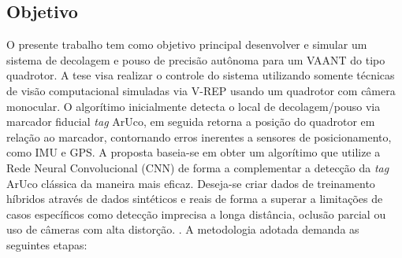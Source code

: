 

\subsection{Objetivo}

O presente trabalho tem como objetivo principal desenvolver e simular um sistema de decolagem e pouso de precisão autônoma para um VAANT do tipo quadrotor. A tese visa realizar o controle do sistema utilizando somente técnicas de visão computacional simuladas via V-REP usando um quadrotor com câmera monocular. O algorítimo inicialmente detecta o local de decolagem/pouso via marcador fiducial \textit{tag} ArUco, em seguida retorna a posição do quadrotor em relação ao marcador, contornando erros inerentes a sensores de posicionamento, como IMU e GPS. A proposta baseia-se em obter um algorítimo que utilize a Rede Neural Convolucional (CNN) de forma a complementar a detecção da \textit{tag} ArUco clássica da maneira mais eficaz. Deseja-se criar dados de treinamento híbridos através de dados sintéticos e reais de forma a superar a limitações de casos específicos como detecção imprecisa a longa distância, oclusão parcial ou uso de câmeras com alta distorção. . A metodologia adotada demanda as seguintes etapas:


